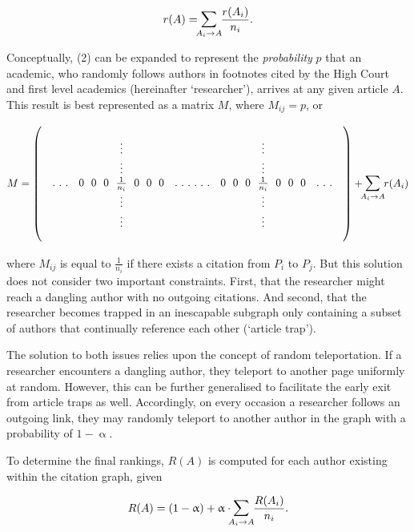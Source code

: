 \begin{equation}
r(A) = \mathlarger{\sum}_{\mathclap{A_i \rightarrow A}} \ \frac{r(A_i)}{n_i}.
\end{equation}

Conceptually, (2) can be expanded to represent the \emph{probability} $p$ that an academic, who randomly follows authors in footnotes cited by the High Court and first level academics (hereinafter `researcher'), arrives at any given article $A$. This result is best represented as a matrix $M$, where $M_{ij} = p$, or

\[
M = 
\begin{pmatrix}
&             &                                         &                          &                                        &             & \\
&             &  \vdots                                 &                          &   \vdots                               &             & \\
&             &  \vdots                                 &                          &   \vdots                               &             & \\
& . \ . \ .   &  0 \ \ 0 \ \ 0 \ \ \frac{1}{n_i} \ \ 0 \ \ 0 \ \ 0 & . \ . \ . \  . \ . \ .   & 0 \ \ 0 \ \ 0 \ \ \frac{1}{n_i} \ \ 0 \ \ 0 \ \ 0 & . \ . \ .   & \\
&             &  \vdots                                 &                          &   \vdots                               &             & \\
&             &  \vdots                                 &                          &   \vdots                               &             & \\
&             &                                         &                          &                                        &             & \\
\end{pmatrix} + \mathlarger{\sum}_{\mathclap{A_i \rightarrow A}} \ r(A_i)
\]

where $M_{ij}$ is equal to $\frac{1}{n_i}$ if there exists a citation from $P_i$ to $P_j$. But this solution does not consider two important constraints. First, that the researcher might reach a dangling author with no outgoing citations. And second, that the researcher becomes trapped in an inescapable subgraph only containing a subset of authors that continually reference each other (`article trap').

The solution to both issues relies upon the concept of random teleportation. If a researcher encounters a dangling author, they teleport to another page uniformly at random. However, this can be further generalised to facilitate the early exit from article traps as well. Accordingly, on every occasion a researcher follows an outgoing link, they may randomly teleport to another author in the graph with a probability of $1-\upalpha$.

To determine the final rankings, $R(A)$ is computed for each author existing within the citation graph, given

\[R(A) = (1-\upalpha) + \upalpha \cdot \mathlarger{\sum}_{\mathclap{A_i \rightarrow A}} \ \frac{R(A_i)}{n_i}.\]
